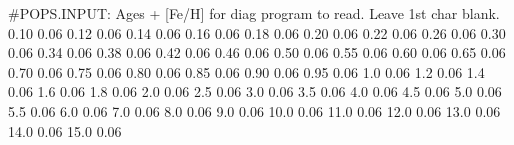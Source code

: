 #POPS.INPUT:  Ages + [Fe/H] for diag program to read. Leave 1st char blank.
 0.10  0.06
 0.12  0.06
 0.14  0.06
 0.16  0.06
 0.18  0.06
 0.20  0.06
 0.22  0.06
 0.26  0.06
 0.30  0.06
 0.34  0.06
 0.38  0.06
 0.42  0.06
 0.46  0.06
 0.50  0.06
 0.55  0.06
 0.60  0.06
 0.65  0.06
 0.70  0.06
 0.75  0.06
 0.80  0.06
 0.85  0.06
 0.90  0.06
 0.95  0.06
 1.0  0.06
 1.2  0.06
 1.4  0.06
 1.6  0.06
 1.8  0.06
 2.0  0.06
 2.5  0.06
 3.0  0.06
 3.5  0.06
 4.0  0.06
 4.5  0.06
 5.0  0.06
 5.5  0.06
 6.0  0.06
 7.0  0.06
 8.0  0.06
 9.0  0.06
 10.0  0.06
 11.0  0.06
 12.0  0.06
 13.0  0.06
 14.0  0.06
 15.0  0.06
